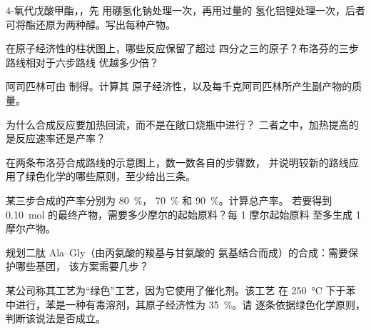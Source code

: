 \begin{exercise}[$\star\star$]\label{exo:g12:synthesis-strategy:7}
4-氧代戊酸甲酯，，先
用硼氢化钠处理一次，再用过量的
氢化铝锂处理一次，后者可将酯还原为两种醇。写出每种产物。
\end{exercise}

\begin{exercise}[$\star\star$]\label{exo:g12:synthesis-strategy:8}
在原子经济性的柱状图上，哪些反应保留了超过
四分之三的原子？布洛芬的三步路线相对于六步路线
优越多少倍？
\end{exercise}

\begin{exercise}[$\star\star$]\label{exo:g12:synthesis-strategy:9}
阿司匹林可由  制得。计算其
原子经济性，以及每千克阿司匹林所产生副产物的质量。
\end{exercise}

\begin{exercise}[$\star\star$]\label{exo:g12:synthesis-strategy:10}
为什么合成反应要加热回流，而不是在敞口烧瓶中进行？
二者之中，加热提高的是反应速率还是产率？
\end{exercise}

\begin{exercise}[$\star\star$]\label{exo:g12:synthesis-strategy:11}
在两条布洛芬合成路线的示意图上，数一数各自的步骤数，
并说明较新的路线应用了绿色化学的哪些原则，至少给出三条。
\end{exercise}

\begin{exercise}[$\star\star\star$]\label{exo:g12:synthesis-strategy:12}
某三步合成的产率分别为 \qty{80}{\percent}，
\qty{70}{\percent} 和 \qty{90}{\percent}。计算总产率。
若要得到 \qty{0.10}{mol}
的最终产物，需要多少摩尔的起始原料？每 1 摩尔起始原料
至多生成 1 摩尔产物。
\end{exercise}

\begin{exercise}[$\star\star\star$]\label{exo:g12:synthesis-strategy:13}
规划二肽 Ala--Gly（由丙氨酸的羧基与甘氨酸的
氨基结合而成）的合成：需要保护哪些基团，
该方案需要几步？
\end{exercise}

\begin{exercise}[$\star\star\star$]\label{exo:g12:synthesis-strategy:14}
某公司称其工艺为“绿色”工艺，因为它使用了催化剂。该工艺
在 \qty{250}{\celsius} 下于苯中进行，苯是一种有毒溶剂，其原子经济性为
\qty{35}{\percent}。请
逐条依据绿色化学原则，判断该说法是否成立。
\end{exercise}

